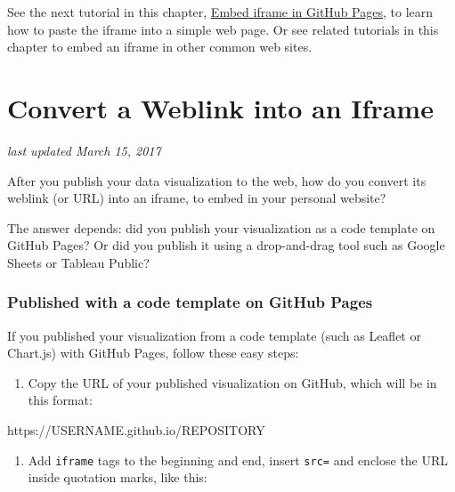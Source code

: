 \documentclass[
  english,
]{book}
\newenvironment{Shaded}{\begin{snugshade}}{\end{snugshade}}
\newcommand{\NormalTok}[1]{#1}
\providecommand{\tightlist}{%
  \setlength{\itemsep}{0pt}\setlength{\parskip}{0pt}}
\begin{document}
See the next tutorial in this chapter, \href{iframe-github}{Embed iframe in GitHub Pages}, to learn how to paste the iframe into a simple web page. Or see related tutorials in this chapter to embed an iframe in other common web sites.

\hypertarget{link-to-iframe}{%
\section{Convert a Weblink into an Iframe}\label{link-to-iframe}}

\emph{last updated March 15, 2017}

After you publish your data visualization to the web, how do you convert its weblink (or URL) into an iframe, to embed in your personal website?

The answer depends: did you publish your visualization as a code template on GitHub Pages? Or did you publish it using a drop-and-drag tool such as Google Sheets or Tableau Public?

\hypertarget{published-with-a-code-template-on-github-pages}{%
\subsubsection*{Published with a code template on GitHub Pages}\label{published-with-a-code-template-on-github-pages}}

If you published your visualization from a code template (such as Leaflet or Chart.js) with GitHub Pages, follow these easy steps:

\begin{enumerate}
\def\labelenumi{\arabic{enumi})}
\tightlist
\item
  Copy the URL of your published visualization on GitHub, which will be in this format:
\end{enumerate}

\begin{Shaded}
\begin{Highlighting}[]
\NormalTok{https://USERNAME.github.io/REPOSITORY}
\end{Highlighting}
\end{Shaded}

\begin{enumerate}
\def\labelenumi{\arabic{enumi})}
\setcounter{enumi}{1}
\tightlist
\item
  Add \texttt{iframe} tags to the beginning and end, insert \texttt{src=} and enclose the URL inside quotation marks, like this:
\end{enumerate}
\end{document}
